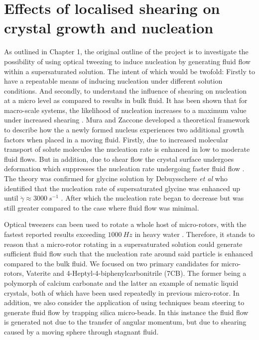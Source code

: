 \chapter{Effects of localised shearing on crystal growth and nucleation}
As outlined in Chapter 1, the original outline of the project is to 
investigate the possibility of using optical tweezing to induce nucleation 
by generating fluid flow within a supersaturated solution. The intent 
of which would be twofold: Firstly to have a repeatable means of 
inducing nucleation under different solution conditions. And secondly, 
to understand the influence of shearing on nucleation at a micro 
level as compared to results in bulk fluid. It has been shown that 
for macro-scale systems, the likelihood of nucleation increases to 
a maximum value under increased shearing \cite{Debuysschere2023, 
Mura2016}. Mura and Zaccone developed a theoretical framework to 
describe how the a newly formed nucleus experiences two additional 
growth factors when placed in a moving fluid. Firstly, due to increased 
molecular transport of solute molecules the nucleation rate is enhanced 
in low to moderate fluid flows. But in addition, due to shear flow the 
crystal surface undergoes deformation which suppresses the nucleation 
rate undergoing faster fluid flow \cite{Mura2016}. The theory was 
confirmed for glycine solution by Debuysschere \textit{et al} who
identified that the nucleation rate of supersaturated glycine was 
enhanced up until $\dot{\gamma}\approx3000\ s^{-1}$ \cite{Debuysschere2023}.
After which the nucleation rate began to decrease but was 
still greater compared to the case where fluid flow was minimal.

Optical tweezers can been used to rotate a whole host of micro-rotors, 
with the fastest reported results exceeding $1000\ Hz$ in heavy water
\cite{Arita2016}. Therefore, it stands to reason that a micro-rotor
rotating in a supersaturated solution could generate sufficient fluid
flow such that the nucleation rate around said particle is enhanced 
compared to the bulk fluid. We focused on two primary candidates for
micro-rotors, Vaterite and 4-Heptyl-4-biphenylcarbonitrile (7CB). The
former being a polymorph of calcium carbonate and the latter an example
of nematic liquid crystals, both of which have been used repeatedly in
previous micro-rotor. In addition, we also consider the application of
using techniques beam steering to generate fluid flow by trapping silica
micro-beads. In this instance the fluid flow is generated not due to the
transfer of angular momentum, but due to shearing caused by a moving 
sphere through stagnant fluid.


